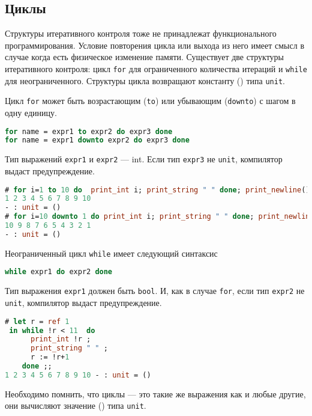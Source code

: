 \subsection{Циклы}
\label{subsec:loops}

Структуры итеративного контроля тоже не принадлежат  функционального
программирования. Условие повторения цикла или выхода из него имеет смысл в
случае когда есть физическое изменение памяти. Существует две структуры
итеративного контроля: цикл \texttt{for} для ограниченного количества итераций и
\texttt{while} для неограниченного. Структуры цикла возвращают константу () типа
\texttt{unit}.

Цикл \texttt{for} может быть возрастающим (\texttt{to}) или убывающим
(\texttt{downto}) с шагом в одну единицу.

\begin{lstlisting}[language=OCaml]
for name = expr1 to expr2 do expr3 done
for name = expr1 downto expr2 do expr3 done
\end{lstlisting}

Тип выражений \texttt{expr1} и \texttt{expr2} --- int. Если тип \texttt{expr3}
не \texttt{unit}, компилятор выдаст предупреждение.

\begin{lstlisting}[language=OCaml]
# for i=1 to 10 do  print_int i; print_string " " done; print_newline() ;;
1 2 3 4 5 6 7 8 9 10
- : unit = ()
# for i=10 downto 1 do print_int i; print_string " " done; print_newline() ;;
10 9 8 7 6 5 4 3 2 1
- : unit = ()
\end{lstlisting}

Неограниченный цикл \texttt{while} имеет следующий синтаксис

\begin{lstlisting}[language=OCaml]
while expr1 do expr2 done
\end{lstlisting}

Тип выражения \texttt{expr1} должен быть \texttt{bool}. И, как в случае
\texttt{for}, если тип \texttt{expr2} не \texttt{unit}, компилятор выдаст
предупреждение.

\begin{lstlisting}[language=OCaml]
# let r = ref 1
 in while !r < 11  do
      print_int !r ;
      print_string " " ;
      r := !r+1
    done ;;
1 2 3 4 5 6 7 8 9 10 - : unit = ()
\end{lstlisting}

Необходимо помнить, что циклы --- это такие же выражения как и любые другие, они
вычисляют значение () типа \texttt{unit}.

